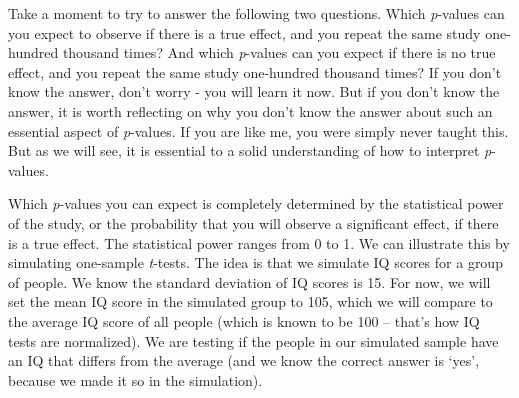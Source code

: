 \documentclass[
  oneside]{book}
\newenvironment{Shaded}{\begin{snugshade}}{\end{snugshade}}
\newcommand{\AttributeTok}[1]{\textcolor[rgb]{0.77,0.63,0.00}{#1}}
\newcommand{\CommentTok}[1]{\textcolor[rgb]{0.56,0.35,0.01}{\textit{#1}}}
\newcommand{\ControlFlowTok}[1]{\textcolor[rgb]{0.13,0.29,0.53}{\textbf{#1}}}
\newcommand{\DecValTok}[1]{\textcolor[rgb]{0.00,0.00,0.81}{#1}}
\newcommand{\FloatTok}[1]{\textcolor[rgb]{0.00,0.00,0.81}{#1}}
\newcommand{\FunctionTok}[1]{\textcolor[rgb]{0.00,0.00,0.00}{#1}}
\newcommand{\NormalTok}[1]{#1}
\newcommand{\OtherTok}[1]{\textcolor[rgb]{0.56,0.35,0.01}{#1}}
\newcommand{\SpecialCharTok}[1]{\textcolor[rgb]{0.00,0.00,0.00}{#1}}
\begin{document}
Take a moment to try to answer the following two questions. Which \emph{p}-values can you expect to observe if there is a true effect, and you repeat the same study one-hundred thousand times? And which \emph{p}-values can you expect if there is no true effect, and you repeat the same study one-hundred thousand times? If you don't know the answer, don't worry - you will learn it now. But if you don't know the answer, it is worth reflecting on why you don't know the answer about such an essential aspect of \emph{p}-values. If you are like me, you were simply never taught this. But as we will see, it is essential to a solid understanding of how to interpret \emph{p}-values.

Which \emph{p}-values you can expect is completely determined by the statistical power of the study, or the probability that you will observe a significant effect, if there is a true effect. The statistical power ranges from 0 to 1. We can illustrate this by simulating one-sample \emph{t}-tests. The idea is that we simulate IQ scores for a group of people. We know the standard deviation of IQ scores is 15. For now, we will set the mean IQ score in the simulated group to 105, which we will compare to the average IQ score of all people (which is known to be 100 -- that's how IQ tests are normalized). We are testing if the people in our simulated sample have an IQ that differs from the average (and we know the correct answer is `yes', because we made it so in the simulation).

\begin{Shaded}
\end{Shaded}
\end{document}
